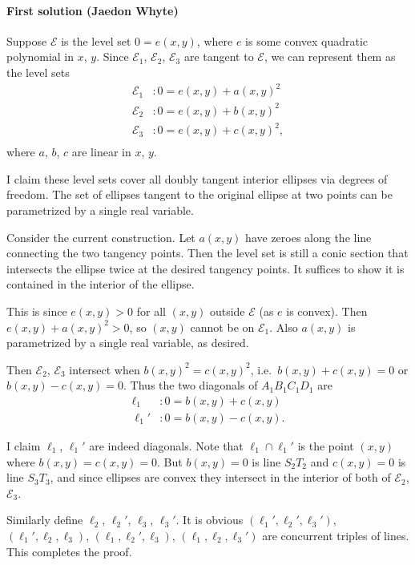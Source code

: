 \paragraph{First solution (Jaedon Whyte)} Suppose $\mathcal E$ is the level set $0=e(x,y)$, where $e$ is some convex quadratic polynomial in $x$, $y$. Since $\mathcal E_1$, $\mathcal E_2$, $\mathcal E_3$ are tangent to $\mathcal E$, we can represent them as the level sets
\begin{align*}
    \mathcal E_1&:0=e(x,y)+a(x,y)^2\\
    \mathcal E_2&:0=e(x,y)+b(x,y)^2\\
    \mathcal E_3&:0=e(x,y)+c(x,y)^2,\\
\end{align*}
where $a$, $b$, $c$ are linear in $x$, $y$.
\begin{remark}
    I claim these level sets cover all doubly tangent interior ellipses via degrees of freedom. The set of ellipses tangent to the original ellipse at two points can be parametrized by a single real variable.

    Consider the current construction. Let $a(x,y)$ have zeroes along the line connecting the two tangency points. Then the level set is still a conic section that intersects the ellipse twice at the desired tangency points. It suffices to show it is contained in the interior of the ellipse.

    This is since $e(x,y)>0$ for all $(x,y)$ outside $\mathcal E$ (as $e$ is convex). Then $e(x,y)+a(x,y)^2>0$, so $(x,y)$ cannot be on $\mathcal E_1$. Also $a(x,y)$ is parametrized by a single real variable, as desired.
\end{remark}
Then $\mathcal E_2$, $\mathcal E_3$ intersect when $b(x,y)^2=c(x,y)^2$, i.e.\ $b(x,y)+c(x,y)=0$ or $b(x,y)-c(x,y)=0$. Thus the two diagonals of $A_1B_1C_1D_1$ are
\begin{align*}
    \ell_1&:0=b(x,y)+c(x,y)\\
    \ell_1'&:0=b(x,y)-c(x,y).
\end{align*}
\begin{remark}
    I claim $\ell_1$, $\ell_1'$ are indeed diagonals. Note that $\ell_1\cap\ell_1'$ is the point $(x,y)$ where $b(x,y)=c(x,y)=0$. But $b(x,y)=0$ is line $S_2T_2$ and $c(x,y)=0$ is line $S_3T_3$, and since ellipses are convex they intersect in the interior of both of $\mathcal E_2$, $\mathcal E_3$.
\end{remark}
Similarly define $\ell_2$, $\ell_2'$, $\ell_3$, $\ell_3'$. It is obvious $(\ell_1',\ell_2',\ell_3')$, $(\ell_1',\ell_2,\ell_3)$, $(\ell_1,\ell_2',\ell_3)$, $(\ell_1,\ell_2,\ell_3')$ are concurrent triples of lines. This completes the proof.

